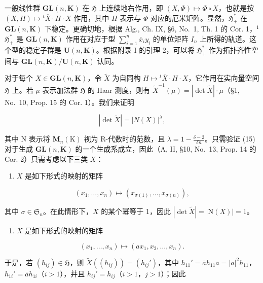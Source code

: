 一般线性群 \(\mathbf{GL}(n,\mathbf{K})\) 在 \(\mathfrak{H}\) 上连续地右作用，即 \((X,\Phi)\mapsto\Phi\circ X\)，也就是按 \((X,H)\mapsto{}^{t}\overline{X}\cdot H\cdot X\) 作用，其中 \(H\) 表示与 \(\Phi\) 对应的厄米矩阵。显然，\(\mathfrak{H}_{+}^{*}\) 在 \(\mathbf{GL}(n,\mathbf{K})\) 下稳定。更确切地，根据 Alg., Ch. IX, §6, No.~1, Th. 1 的 Cor. 1，\(^{1}\) \(\mathfrak{H}_{+}^{*}\) 是 \(\mathbf{GL}(n,\mathbf{K})\) 作用在对应于型 \(\sum_{i=1}^{n}\overline{x}_{i}y_{i}\) 的单位矩阵 \(I_{n}\) 上所得的轨道。这个型的稳定子群是 \(\mathbf{U}(n,\mathbf{K})\)。根据附录 I 的引理 2，可以将 \(\mathfrak{H}_{+}^{*}\) 作为拓扑齐性空间与 \(\mathbf{GL}(n,\mathbf{K})/\mathbf{U}(n,\mathbf{K})\) 认同。

对于每个 \(X \in \mathbf{GL}(n, \mathbf{K})\)，令 \(\widetilde{X}\) 为自同构 \(H \mapsto {}^t \overline{X} \cdot H \cdot X\)，它作用在实向量空间 \(\mathfrak{H}\) 上。若 \(\mu\) 表示加法群 \(\mathfrak{H}\) 的 Haar 测度，则有 \(\widetilde{X}^{-1}(\mu) = |\det \widetilde{X}| \cdot \mu\)（§1, No.~10, Prop. 15 的 Cor. 1）。我们来证明

\[
| \det \widetilde {X} | = | N (X) | ^ {\lambda},\tag{15}
\]

其中 N 表示将 \(\mathbf{M}_{n}(\mathrm{K})\) 视为 R-代数时的范数，且 \(\lambda = 1 - \frac{\delta - 2}{\delta n}\)。只需验证 (15) 对于生成 \(\mathbf{GL}(n,\mathbf{K})\) 的一个生成系成立，因此（A, II, §10, No.~13, Prop. 14 的 Cor. 2）只需考虑以下三类 \(X\)：

\begin{enumerate}
\def\labelenumi{\alph{enumi})}
\tightlist
\item
  \(X\) 是如下形式的映射的矩阵
\end{enumerate}

\[
\left(x _ {1}, \dots , x _ {n}\right) \mapsto \left(x _ {\sigma (1)}, \dots , x _ {\sigma (n)}\right),
\]

其中 \(\sigma \in \mathfrak{S}_n\)。在此情形下，\(X\) 的某个幂等于 1，因此 \(|\det \widetilde{X}| = |\mathrm{N}(X)| = 1\)。

\begin{enumerate}
\def\labelenumi{\alph{enumi})}
\setcounter{enumi}{1}
\tightlist
\item
  \(X\) 是如下形式的映射的矩阵
\end{enumerate}

\[
\left(x _ {1}, \dots , x _ {n}\right) \mapsto \left(a x _ {1}, x _ {2}, \dots , x _ {n}\right).
\]

于是，若 \((h_{ij})\in \mathfrak{H}\)，则 \(\widetilde{X} ((h_{ij})) = (h_{ij}')\)，其中 \(h_{11}' = \overline{a} h_{11}a = |a|^2 h_{11}\)，\(h_{1i}' = \overline{a} h_{1i}\)（\(i > 1\)），并且 \(h_{ij}' = h_{ij}\)（\(i > 1\)，\(j > 1\)）；因此

